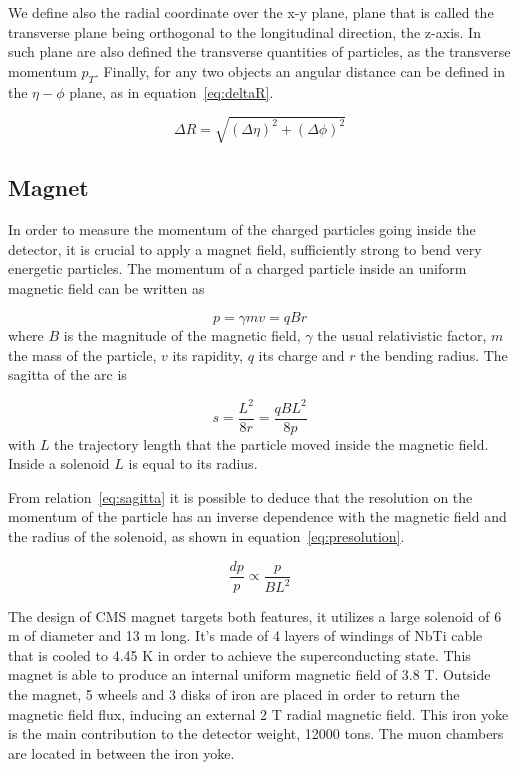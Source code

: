 We define also the radial coordinate over the x-y plane, plane that is called the transverse plane being orthogonal to the longitudinal direction, the z-axis. In such plane are also defined the transverse quantities of particles, as the transverse momentum $p_{T}$. Finally, for any two objects an angular distance can be defined in the $\eta-\phi$ plane, as in equation~\ref{eq:deltaR}.

\begin{equation}
  \label{eq:deltaR}
  \Delta R=\sqrt{(\Delta\eta)^{2}+(\Delta\phi)^{2}}
\end{equation}

\subsection{Magnet}
\label{sec:magnet}

In order to measure the momentum of the charged particles going inside the detector, it is crucial to apply a magnet field, sufficiently strong to bend very energetic particles. The momentum of a charged particle inside an uniform magnetic field can be written as

\begin{equation}
  \label{eq:momB}
  p=\gamma m v=qBr
\end{equation} where $B$ is the magnitude of the magnetic field, $\gamma$ the usual relativistic factor, $m$ the mass of the particle, $v$ its rapidity, $q$ its charge and $r$ the bending radius. The sagitta of the arc is

\begin{equation}
  \label{eq:sagitta}
  s=\frac{L^{2}}{8r}=\frac{qBL^{2}}{8p}
\end{equation} with $L$ the trajectory length that the particle moved inside the magnetic field. Inside a solenoid $L$ is equal to its radius. 

From relation~\ref{eq:sagitta} it is possible to deduce that the resolution on the momentum of the particle has an inverse dependence with the magnetic field and the radius of the solenoid, as shown in equation~\ref{eq:presolution}. %

\begin{equation}
  \label{eq:presolution}
  \frac{dp}{p}\propto \frac{p}{BL^{2}}
\end{equation}

The design of CMS magnet targets both features, it utilizes a large solenoid of 6 m of diameter and 13 m long. It's made of 4 layers of windings of NbTi cable that is cooled to 4.45 K in order to achieve the superconducting state. This magnet is able to produce an internal uniform magnetic field of 3.8 T. Outside the magnet, 5 wheels and 3 disks of iron are placed in order to return the magnetic field flux, inducing an external 2 T radial magnetic field. This iron yoke is the main contribution to the detector weight, 12000 tons. The muon chambers are located in between the iron yoke.

